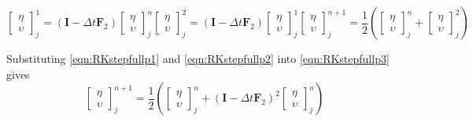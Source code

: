 \begin{subequations}
	\label{eqn:RKstepfull}
	\begin{equation}
	\label{eqn:RKstepfullp1}
	\left[\begin{array}{c}
	\eta \\ \upsilon
	\end{array}\right]^{1}_j = \left(\boldsymbol{I} - \Delta t\boldsymbol{F}_2 \right)\left[\begin{array}{c}
	\eta \\ \upsilon
	\end{array}\right]^{n}_j
	\end{equation}
	
	\begin{equation}
	\label{eqn:RKstepfullp2}
	\left[\begin{array}{c}
	\eta \\ \upsilon
	\end{array}\right]^{2}_j = \left(\boldsymbol{I} - \Delta t\boldsymbol{F}_2 \right)\left[\begin{array}{c}
	\eta \\ \upsilon
	\end{array}\right]^{1}_j
	\end{equation}
		
	\begin{equation}
	\label{eqn:RKstepfullp3}
	\left[\begin{array}{c}
	\eta \\ \upsilon
	\end{array}\right]^{n+1}_j = \frac{1}{2} \left(\left[\begin{array}{c}
	\eta \\ \upsilon
	\end{array}\right]^{n}_j + \left[\begin{array}{c}
	\eta \\ \upsilon
	\end{array}\right]^{2}_j\right) 
	\end{equation}
\end{subequations}


Substituting \eqref{eqn:RKstepfullp1} and \eqref{eqn:RKstepfullp2} into \eqref{eqn:RKstepfullp3} gives
\begin{equation*}
\left[\begin{array}{c}
\eta \\ \upsilon
\end{array}\right]^{n+1}_j = \frac{1}{2} \left(\left[\begin{array}{c}
\eta \\ \upsilon
\end{array}\right]^{n}_j + \left(\boldsymbol{I} - \Delta t\boldsymbol{F}_2 \right)^2 \left[\begin{array}{c}
\eta \\ \upsilon
\end{array}\right]^{n}_j\right)
\end{equation*}

